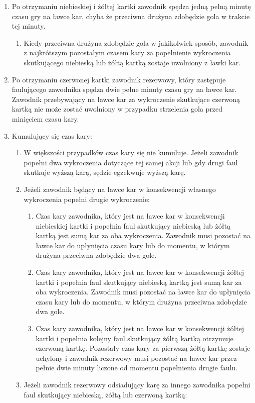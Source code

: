 \documentclass[12pt]{article}
\begin{document}
\begin{enumerate}
\item Po otrzymaniu niebieskiej i żółtej kartki zawodnik spędza jedną
  pełną minutę czasu gry na ławce kar, chyba że przeciwna drużyna
  zdobędzie gola w trakcie tej minuty.
  
  \begin{enumerate}
  \item
        Kiedy przeciwna drużyna zdobędzie gola w jakikolwiek sposób,
    zawodnik z najkrótszym pozostałym czasem kary za popełnienie
    wykroczenia skutkującego niebieską lub żółtą kartką zostaje
    uwolniony z ławki kar.
      \end{enumerate}
\item
    Po otrzymaniu czerwonej kartki zawodnik rezerwowy, który zastępuje
  faulującego zawodnika spędza dwie pełne minuty czasu gry na ławce kar.
  Zawodnik przebywający na ławce kar za wykroczenie skutkujące czerwoną
  kartką nie może zostać uwolniony w przypadku strzelenia gola przed
  minięciem czasu kary.
  \item
    Kumulujący się czas kary:
  
  \begin{enumerate}
  \item
        W większości przypadków czas kary się nie kumuluje. Jeżeli zawodnik
    popełni dwa wykroczenia dotyczące tej samej akcji lub gdy drugi faul
    skutkuje wyższą karą, sędzie egzekwuje wyższą karę.
      \item
        Jeżeli zawodnik będący na ławce kar w konsekwencji własnego
    wykroczenia popełni drugie wykroczenie:
    
    \begin{enumerate}
    \item
            Czas kary zawodnika, który jest na ławce kar w konsekwencji
      niebieskiej kartki i popełnia faul skutkujący niebieską lub żółtą
      kartką jest sumą kar za oba wykroczenia. Zawodnik musi pozostać na
      ławce kar do upłynięcia czasu kary lub do momentu, w którym
      drużyna przeciwna zdobędzie dwa gole.
          \item
            Czas kary zawodnika, który jest na ławce kar w konsekwencji żółtej
      kartki i popełnia faul skutkujący niebieską kartką jest sumą kar
      za oba wykroczenia. Zawodnik musi pozostać na ławce kar do
      upłynięcia czasu kary lub do momentu, w którym drużyna przeciwna
      zdobędzie dwa gole.
          \item
            Czas kary zawodnika, który jest na ławce kar w konsekwencji żółtej
      kartki i popełnia kolejny faul skutkujący żółtą kartką otrzymuje
      czerwoną kartkę. Pozostały czas kary za pierwszą żółtą kartkę
      zostaje uchylony i zawodnik rezerwowy musi pozostać na ławce kar
      przez pełnie dwie minuty liczone od momentu popełnienia drugie
      faulu.
          \end{enumerate}
  \item
        Jeżeli zawodnik rezerwowy odsiadujący karę za innego zawodnika
    popełni faul skutkujący niebieską, żółtą lub czerwoną kartką:
    

\end{enumerate}
\end{enumerate}
\end{document}
